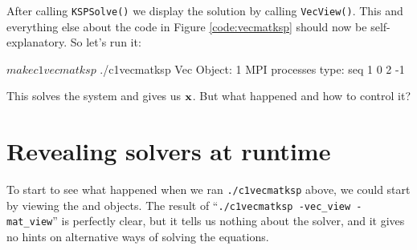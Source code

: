 
After calling \texttt{KSPSolve()} we display the solution \pVec by calling \texttt{VecView()}.  This and everything else about the code in Figure \ref{code:vecmatksp} should now be self-explanatory.  So let's run it:
\begin{cline}
$ make c1vecmatksp
$ ./c1vecmatksp
Vec Object: 1 MPI processes
  type: seq
1
0
2
-1
\end{cline}
This solves the system and gives us $\mathbf{x}$.  But what happened and how to control it?


\section{Revealing solvers at runtime}

To start to see what happened when we ran \texttt{./c1vecmatksp} above, we could start by viewing the \pVec and \pMat objects.  The result of ``\texttt{./c1vecmatksp -vec\_view -mat\_view}'' is perfectly clear, but it tells us nothing about the solver, and it gives no hints on alternative ways of solving the equations.

